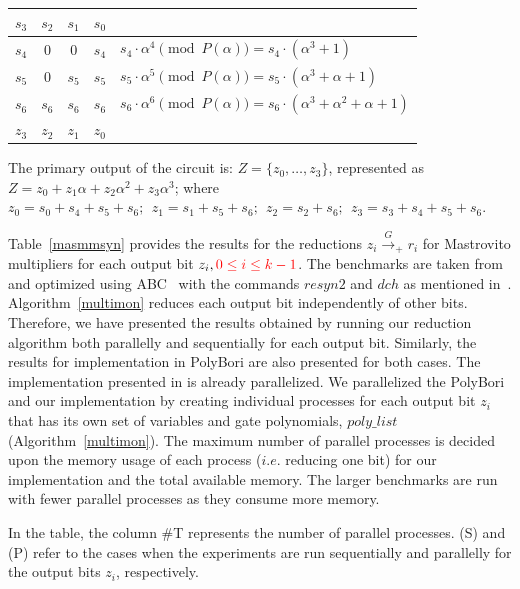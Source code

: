 \begin{Example}
{\vspace{0.05in}

{\small
{\begin{tabular}{|c c c c | l }
  $s_3$   &$s_2$    &$s_1$   &$s_0$   &   \\
 \hline
 $s_4$    &$0$    &$0$   &$s_4$   &$s_4\cdot \alpha^4 \pmod{P(\alpha)} = s_4 \cdot (\alpha^3 + 1)$\\
 $s_5$    &$0$    &$s_5$   &$s_5$     &$s_5\cdot \alpha^5 \pmod{P(\alpha)} = s_5\cdot (\alpha^3+ \alpha + 1)$\\
 $s_6$    &$s_6$    &$s_6$   &$s_6$     &$s_6\cdot \alpha^6 \pmod{ P(\alpha)} = s_6\cdot( \alpha^3 + \alpha^2 + \alpha + 1)$\\
 \hline
 $z_3$    &$z_2$    &$z_1$   &$z_0$   &
 \end{tabular}\par}
}

\vspace{0.05in}

The primary output of the circuit is: $Z = \{z_0, \dots, z_3\}$,
represented as $Z =  z_0 + z_1 \alpha + z_2
\alpha^2 + z_3 \alpha^3$; where  $z_0=s_0+s_4+s_5+s_6; ~~z_1=s_1+s_5+s_6;
~~z_2=s_2+s_6; ~~z_3=s_3+s_4+s_5+s_6$. 
}
\end{Example}

\par Table~\ref{masmmsyn} provides the results for the reductions $z_i
\xrightarrow{G}_+ r_i$ for Mastrovito multipliers for each output bit
$z_i, \textcolor{red}{0\leq i \leq k-1}$. The benchmarks are taken
from~\cite{lv:tcad2013} and optimized using ABC~\cite{ABCtool} with
the commands $resyn2$ and $dch$ as mentioned
in~\cite{cunxi:aspdac17}. Algorithm~\ref{multimon} reduces each output
bit independently of other bits. Therefore, we have presented the
results obtained by running our reduction algorithm both parallelly and
sequentially for each output bit. Similarly, the results for
implementation in PolyBori are also presented for both cases. The
implementation presented in \cite{cunxi:aspdac17} is already
parallelized. We parallelized the PolyBori and our implementation by
creating individual processes for  each output bit $z_i$ that has its
own set of variables and gate polynomials, $poly\_list$
(Algorithm~\ref{multimon}). The maximum number of parallel processes
is decided upon the memory usage of each process ($i.e.$ reducing one
bit) for our implementation and the total available memory. The larger
benchmarks are run with fewer parallel processes as they consume more
memory. 
\par In the table, the column \#T represents the number of parallel
processes. (S) and (P) refer to the cases when the experiments are run
sequentially and parallelly for the output bits $z_i$, respectively.  


